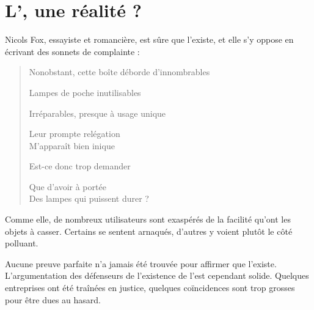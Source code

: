 \section{L'\op, une réalité ?}

Nicols Fox, essayiste et romancière, est sûre que l'\op existe, et elle s'y oppose en écrivant des sonnets de complainte : 
\itshape\begin{center}
\begin{verse}
Nonobstant, cette boîte déborde d'innombrables

Lampes de poche inutilisables

Irréparables, presque à usage unique

Leur prompte relégation\\
M’apparaît bien inique

Est-ce donc trop demander

Que d'avoir à portée\\
Des lampes qui puissent durer ?
\end{verse}
\end{center}
\normalfont
Comme elle, de nombreux utilisateurs sont exaspérés de la facilité qu'ont les objets à casser. Certains se sentent arnaqués, d'autres y voient plutôt le côté polluant. 

\bigbreak

Aucune preuve parfaite n'a jamais été trouvée pour affirmer que l'\op existe. L'argumentation des défenseurs de l'existence de l'\op est cependant solide. Quelques entreprises ont été traînées en justice, quelques coïncidences sont trop grosses pour être dues au hasard. 